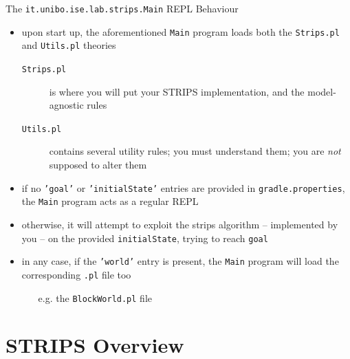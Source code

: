 \documentclass[presentation]{beamer}\mode<presentation>{\usetheme{AMSBolognaFC}}
\begin{document}
\begin{frame}{The \texttt{it.unibo.ise.lab.strips.\alert{Main}} REPL Behaviour}

\begin{itemize}
    \item upon start up, the aforementioned \texttt{Main} program loads both the \texttt{Strips.pl} and \texttt{Utils.pl} theories
    \begin{description}
        \item[\texttt{Strips.pl}] is where you will put your STRIPS implementation, and the model-agnostic rules

        \item[\texttt{Utils.pl}] contains several utility rules; you must \alert{understand} them; you are \emph{not} supposed to alter them
    \end{description}

    \item if no \texttt{'\alert{goal}'} or \texttt{'\alert{initialState}'} entries are provided in  \texttt{gradle.properties}, the \texttt{Main} program acts as a regular REPL
    \vfill

    \item otherwise, it will attempt to exploit the strips algorithm -- implemented by you -- on the provided \texttt{\alert{initialState}}, trying to reach \texttt{\alert{goal}}

    \item in any case, if the \texttt{'\alert{world}'} entry is present, the \texttt{Main} program will load the corresponding \texttt{.pl} file too
    \begin{itemize}
        \item[e.g.] the \texttt{BlockWorld.pl} file
    \end{itemize}
\end{itemize}

\end{frame}

\section{STRIPS Overview}
\end{document}
